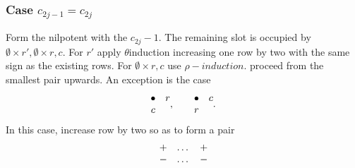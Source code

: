 \documentclass[11pt ,reqno]{amsart}
\begin{document}
\subsubsection{Case $c_{2j-1}=c_{2j}$} Form the nilpotent with the
$c_{2j}-1.$ The remaining slot is occupied by $\emptyset\times r',
\emptyset\times r,c.$ For $r'$  apply $\theta$induction increasing one
row by two with the same sign as the existing rows. For
$\emptyset\times r,c$ use $\rho-induction.$ proceed from the smallest
pair upwards. An exception is the case
$$
\begin{matrix} \bullet&r\\c& \end{matrix},
\qquad
\begin{matrix}\bullet &c\\r &\end{matrix}.
$$
In this case, increase row by two so as to form a pair
$$
\begin{matrix} +&\dots
&+\\ - &\dots & -\end{matrix}
$$
\end{document}
